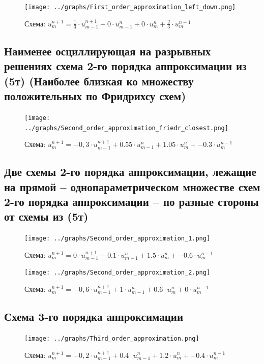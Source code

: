 \documentclass[a4paper, 12pt]{article} %
\begin{document}
\begin{figure}[h!]
    \centering
    \texttt{[image: ../graphs/First\_order\_approximation\_left\_down.png]}
    \caption{Схема: $u^{n+1}_{m} = \frac{1}{3} \cdot u^{n+1}_{m-1} + 0 \cdot u^{n}_{m-1} + 0 \cdot u^{n}_{m} + \frac{2}{3} \cdot u^{n-1}_{m}$}
    \label{fig:vac}
\end{figure} 

\newpage
\subsection{Наименее осциллирующая на разрывных решениях схема 2-го порядка аппроксимации из (5т) (Наиболее близкая ко множеству положительных по Фридрихсу схем)}
\begin{figure}[h!]
    \centering
    \texttt{[image: ../graphs/Second\_order\_approximation\_friedr\_closest.png]}
    \caption{Схема: $u^{n+1}_{m} = -0,3 \cdot u^{n+1}_{m-1} + 0.55 \cdot u^{n}_{m-1} + 1.05 \cdot u^{n}_{m} + -0.3 \cdot u^{n-1}_{m}$ \\ }
    \label{fig:vac}
\end{figure} 

\subsection{Две схемы 2-го порядка аппроксимации, лежащие на прямой – однопараметрическом множестве схем 2-го порядка аппроксимации – по разные стороны от схемы из (5т)}
\begin{figure}[h!]
    \centering
    \texttt{[image: ../graphs/Second\_order\_approximation\_1.png]}
    \caption{Схема: $u^{n+1}_{m} = 0 \cdot u^{n+1}_{m-1} + 0.1 \cdot u^{n}_{m-1} + 1.5 \cdot u^{n}_{m} + -0.6 \cdot u^{n-1}_{m}$ \\ }
    \label{fig:vac}
\end{figure} 

\begin{figure}[h!]
    \centering
    \texttt{[image: ../graphs/Second\_order\_approximation\_2.png]}
    \caption{Схема: $u^{n+1}_{m} = -0,6 \cdot u^{n+1}_{m-1} + 1 \cdot u^{n}_{m-1} + 0.6 \cdot u^{n}_{m} + 0 \cdot u^{n-1}_{m}$ \\ }
    \label{fig:vac}
\end{figure} 

\newpage
\subsection{Схема 3-го порядка аппроксимации}
\begin{figure}[h!]
    \centering
    \texttt{[image: ../graphs/Third\_order\_approximation.png]}
    \caption{Схема: $u^{n+1}_{m} = -0,2 \cdot u^{n+1}_{m-1} + 0.4 \cdot u^{n}_{m-1} + 1.2 \cdot u^{n}_{m} + -0.4 \cdot u^{n-1}_{m}$ \\ }
    \label{fig:vac}
\end{figure}
\end{document}
